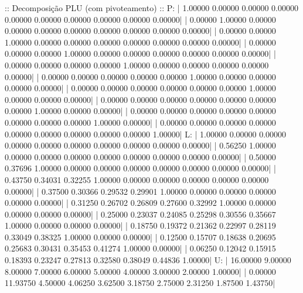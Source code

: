 \documentclass{homework}
\begin{document}
	\begin{fortran}
	 :: Decomposição PLU (com pivoteamento) ::
	P:
	|   1.00000    0.00000    0.00000    0.00000    0.00000    0.00000    0.00000    0.00000    0.00000    0.00000|
	|   0.00000    1.00000    0.00000    0.00000    0.00000    0.00000    0.00000    0.00000    0.00000    0.00000|
	|   0.00000    0.00000    1.00000    0.00000    0.00000    0.00000    0.00000    0.00000    0.00000    0.00000|
	|   0.00000    0.00000    0.00000    1.00000    0.00000    0.00000    0.00000    0.00000    0.00000    0.00000|
	|   0.00000    0.00000    0.00000    0.00000    1.00000    0.00000    0.00000    0.00000    0.00000    0.00000|
	|   0.00000    0.00000    0.00000    0.00000    0.00000    1.00000    0.00000    0.00000    0.00000    0.00000|
	|   0.00000    0.00000    0.00000    0.00000    0.00000    0.00000    1.00000    0.00000    0.00000    0.00000|
	|   0.00000    0.00000    0.00000    0.00000    0.00000    0.00000    0.00000    1.00000    0.00000    0.00000|
	|   0.00000    0.00000    0.00000    0.00000    0.00000    0.00000    0.00000    0.00000    1.00000    0.00000|
	|   0.00000    0.00000    0.00000    0.00000    0.00000    0.00000    0.00000    0.00000    0.00000    1.00000|
	L:
	|   1.00000    0.00000    0.00000    0.00000    0.00000    0.00000    0.00000    0.00000    0.00000    0.00000|
	|   0.56250    1.00000    0.00000    0.00000    0.00000    0.00000    0.00000    0.00000    0.00000    0.00000|
	|   0.50000    0.37696    1.00000    0.00000    0.00000    0.00000    0.00000    0.00000    0.00000    0.00000|
	|   0.43750    0.34031    0.32255    1.00000    0.00000    0.00000    0.00000    0.00000    0.00000    0.00000|
	|   0.37500    0.30366    0.29532    0.29901    1.00000    0.00000    0.00000    0.00000    0.00000    0.00000|
	|   0.31250    0.26702    0.26809    0.27600    0.32992    1.00000    0.00000    0.00000    0.00000    0.00000|
	|   0.25000    0.23037    0.24085    0.25298    0.30556    0.35667    1.00000    0.00000    0.00000    0.00000|
	|   0.18750    0.19372    0.21362    0.22997    0.28119    0.33049    0.38325    1.00000    0.00000    0.00000|
	|   0.12500    0.15707    0.18638    0.20695    0.25683    0.30431    0.35453    0.41274    1.00000    0.00000|
	|   0.06250    0.12042    0.15915    0.18393    0.23247    0.27813    0.32580    0.38049    0.44836    1.00000|
	U:
	|  16.00000    9.00000    8.00000    7.00000    6.00000    5.00000    4.00000    3.00000    2.00000    1.00000|
	|   0.00000   11.93750    4.50000    4.06250    3.62500    3.18750    2.75000    2.31250    1.87500    1.43750|

\end{fortran}
\end{document}
